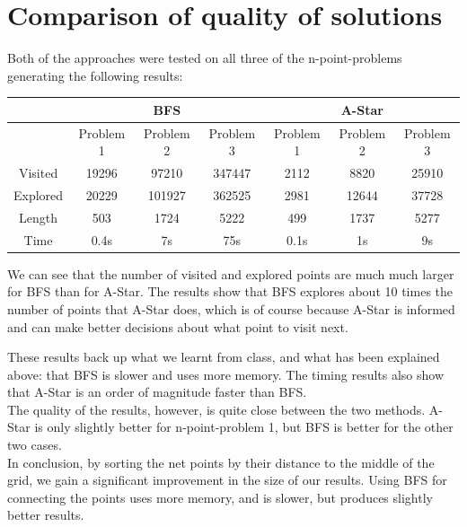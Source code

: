 \documentclass[12pt]{article}
\begin{document}
\section{Comparison of quality of solutions}
Both of the approaches were tested on all three of the n-point-problems
generating the following results:

\vspace{1em}

\begin{center}
\begin{tabular}{|c|c|c|c|c|c|c|}
\hline
& \multicolumn{3}{|c|}{BFS} &
\multicolumn{3}{|c|}{A-Star} \\
\hline
& Problem 1 & Problem 2 & Problem 3 & Problem 1 & Problem 2 & Problem 3\\
\hline
Visited  & 19296 & 97210  & 347447 & 2112 & 8820  & 25910 \\
Explored & 20229 & 101927 & 362525 & 2981 & 12644 & 37728 \\
Length   & 503   & 1724   & 5222   & 499  & 1737  & 5277 \\
Time     & 0.4s  & 7s     & 75s    & 0.1s & 1s    & 9s   \\
\hline
\end{tabular}
\end{center}

\vspace{1em}

We can see that the number of visited and explored points are much much larger
for BFS than for A-Star.  The results show that BFS explores about 10 times the
number of points that A-Star does, which is of course because A-Star is informed
and can make better decisions about what point to visit next.

These results back up what we learnt from class, and what has
been explained above: that BFS is slower and uses more memory.  The timing
results also show that A-Star is an order of magnitude faster than BFS.\\

The quality of the results, however, is quite close between the two methods.
A-Star is only slightly better for n-point-problem 1, but BFS is better for the
other two cases.\\

In conclusion, by sorting the net points by their distance to the middle of the
grid, we gain a significant improvement in the size of our results.  Using BFS
for connecting the points uses more memory, and is slower, but produces slightly
better results.
\end{document}
